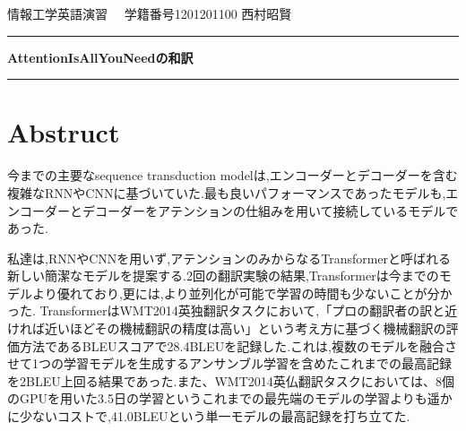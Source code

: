 \documentclass{jarticle}     %
\begin{document}
  \noindent
  \onecolumn
  \hspace{1em}

  情報工学英語演習
  \hfill
  \ \  学籍番号1201201100 西村昭賢 

  \vspace{2mm}
  \hrule
  \begin{center}
  {\Large \bf AttentionIsAllYouNeedの和訳}
  \end{center}
  \hrule
  \vspace{3mm}

\section*{Abstruct}
今までの主要なsequence transduction modelは,エンコーダーとデコーダーを含む
複雑なRNNやCNNに基づいていた.最も良いパフォーマンスであったモデルも,エンコーダーとデコーダーをアテンションの仕組みを用いて接続しているモデルであった.\par
私達は,RNNやCNNを用いず,アテンションのみからなるTransformerと呼ばれる新しい簡潔なモデルを提案する.2回の翻訳実験の結果,Transformerは今までのモデルより優れており,更には,より並列化が可能で学習の時間も少ないことが分かった.
TransformerはWMT2014英独翻訳タスクにおいて,「プロの翻訳者の訳と近ければ近いほどその機械翻訳の精度は高い」という考え方に基づく機械翻訳の評価方法であるBLEUスコアで28.4BLEUを記録した.これは,複数のモデルを融合させて1つの学習モデルを生成するアンサンブル学習を含めたこれまでの最高記録を2BLEU上回る結果であった.また、WMT2014英仏翻訳タスクにおいては、8個のGPUを用いた3.5日の学習というこれまでの最先端のモデルの学習よりも遥かに少ないコストで,41.0BLEUという単一モデルの最高記録を打ち立てた.

\end{document}
